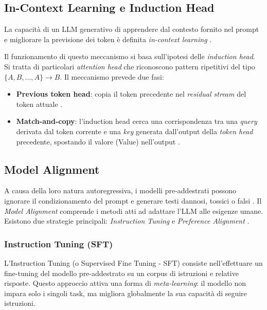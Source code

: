     \subsection{In-Context Learning e Induction Head}

        La capacità di un LLM generativo di apprendere dal contesto fornito nel prompt e migliorare la previsione dei token è definita \textit{in-context learning} . 

        Il funzionamento di questo meccanismo si basa sull'ipotesi delle \textit{induction head}. Si tratta di particolari \textit{attention head} che riconoscono pattern ripetitivi del tipo $\{A,B,...,A\}\rightarrow B$. Il meccanismo prevede due fasi:
        \begin{itemize}
            \item \textbf{Previous token head}: copia il token precedente nel \textit{residual stream} del token attuale .
            \item \textbf{Match-and-copy}: l'induction head cerca una corrispondenza tra una \textit{query} derivata dal token corrente e una \textit{key} generata dall'output della \textit{token head} precedente, spostando il valore (Value) nell'output .
        \end{itemize}

    \subsection{Model Alignment}

        A causa della loro natura autoregressiva, i modelli pre-addestrati possono ignorare il condizionamento del prompt e generare testi dannosi, tossici o falsi . Il \textit{Model Alignment} comprende i metodi atti ad adattare l'LLM alle esigenze umane. Esistono due strategie principali: \textit{Instruction Tuning} e \textit{Preference Alignment} .

        \subsubsection{Instruction Tuning (SFT)}

            L'Instruction Tuning (o Supervised Fine Tuning - SFT) consiste nell'effettuare un fine-tuning del modello pre-addestrato su un corpus di istruzioni e relative risposte. Questo approccio attiva una forma di \textit{meta-learning}: il modello non impara solo i singoli task, ma migliora globalmente la sua capacità di seguire istruzioni.

